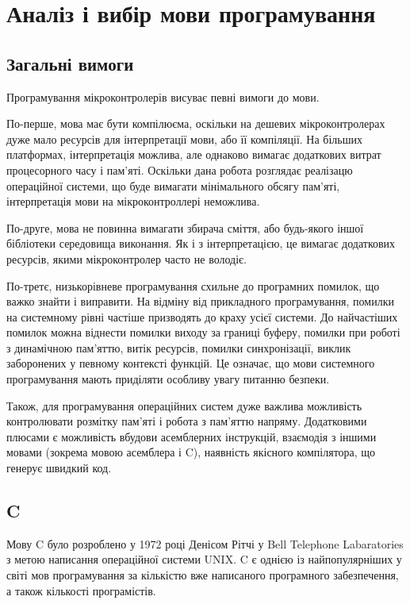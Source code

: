 \documentclass[oneside,14pt,a4paper,final]{myextreport}
\begin{document}
\chapter{Аналіз і вибір мови програмування}

\newcommand\LangC{C}

\section{Загальні вимоги}

Програмування мікроконтролерів висуває певні вимоги до мови.

По-перше, мова має бути компілюєма, оскільки на дешевих мікроконтролерах дуже мало ресурсів для інтерпретації мови, або її компіляції. На більших платформах, інтерпретація можлива, але однаково вимагає додаткових витрат процесорного часу і пам'яті. Оскільки дана робота розглядає реалізацю операційної системи, що буде вимагати мінімального обсягу пам'яті, інтерпретація мови на мікроконтроллері неможлива.

По-друге, мова не повинна вимагати збирача сміття, або будь-якого іншої бібліотеки середовища виконання. Як і з інтерпретацією, це вимагає додаткових ресурсів, якими мікроконтролер часто не володіє.

По-третє, низькорівневе програмування схильне до програмних помилок, що важко знайти і виправити. На відміну від прикладного програмування, помилки на системному рівні частіше призводять до краху усієї системи. До найчастіших помилок можна віднести помилки виходу за границі буферу, помилки при роботі з динамічною пам'яттю, витік ресурсів, помилки синхронізації, виклик заборонених у певному контексті функцій. Це означає, що мови системного програмування мають приділяти особливу увагу питанню безпеки.

Також, для програмування операційних систем дуже важлива можливість контролювати розмітку пам'яті і робота з пам'яттю напряму. Додатковими плюсами є можливість вбудови асемблерних інструкцій, взаємодія з іншими мовами (зокрема мовою асемблера і \LangC{}), наявність якісного компілятора, що генерує швидкий код.

\section{C}

Мову \LangC{} було розроблено у 1972 році Денісом Рітчі у Bell Telephone Labaratories з метою написання операційної системи UNIX\cite{stewart-bill:history-of-c}. \LangC{} є однією із найпопулярніших у світі мов програмування за кількістю вже написаного програмного забезпечення, а також кількості програмістів.
\end{document}
